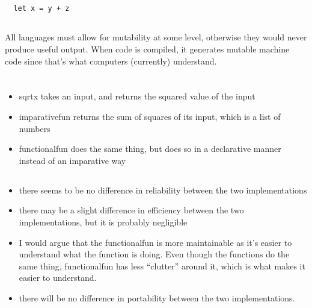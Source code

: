 \documentclass[letterpaper]{article}
\begin{document}
\subsection{}
\begin{verbatim}
  let x = y + z
\end{verbatim}

\subsection{}
All languages must allow for mutability at some level, otherwise they would
never produce useful output. When code is compiled, it generates mutable machine
code since that's what computers (currently) understand.
\section{}

\subsection{}
\begin{itemize}
  \item sqrtx takes an input, and returns the squared value of the input
  \item imparativefun returns the sum of squares of its input, which is a list of numbers
  \item functionalfun does the same thing, but does so in a declarative manner instead of an imparative way
\end{itemize}

\subsection{}
\begin{itemize}
  \item there seems to be no difference in reliability between the two
    implementations
  \item there may be a slight difference in efficiency between the two
    implementations, but it is probably negligible
  \item I would argue that the functionalfun is more maintainable as it's easier to
understand what the function is doing. Even though the functions do the
same thing, functionalfun has less ``clutter'' around it, which is what makes it
easier to understand.
\item there will be no difference in portability between the two
  implementations.
\end{itemize}
\end{document}
